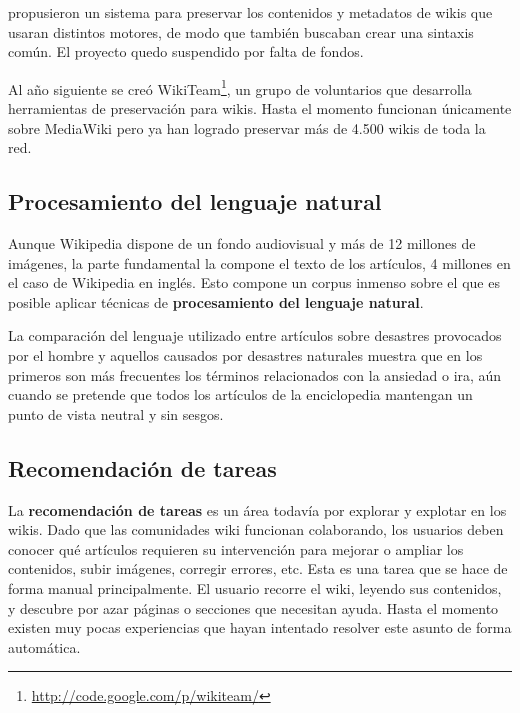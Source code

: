 \documentclass[11pt,onecolumn]{article}
\begin{document}
\citep{popitsch2010} propusieron un sistema para preservar los contenidos y metadatos de wikis que usaran distintos motores, de modo que también buscaban crear una sintaxis común. El proyecto quedo suspendido por falta de fondos.


Al año siguiente se creó WikiTeam\footnote{\href{http://code.google.com/p/wikiteam/}{http://code.google.com/p/wikiteam/}}, un grupo de voluntarios que desarrolla herramientas de preservación para wikis. Hasta el momento funcionan únicamente sobre MediaWiki pero ya han logrado preservar más de 4.500 wikis de toda la red.

\subsection{Procesamiento del lenguaje natural}

Aunque Wikipedia dispone de un fondo audiovisual y más de 12 millones de imágenes, la parte fundamental la compone el texto de los artículos, 4 millones en el caso de Wikipedia en inglés. Esto compone un corpus inmenso sobre el que es posible aplicar técnicas de \textbf{procesamiento del lenguaje natural}.

La comparación del lenguaje utilizado entre artículos sobre desastres provocados por el hombre y aquellos causados por desastres naturales muestra que en los primeros son más frecuentes los términos relacionados con la ansiedad o ira, aún cuando se pretende que todos los artículos de la enciclopedia mantengan un punto de vista neutral y sin sesgos.\citep{ferron2012}

\citep{sateli2012}


\subsection{Recomendación de tareas}

La \textbf{recomendación de tareas} es un área todavía por explorar y explotar en los wikis. Dado que las comunidades wiki funcionan colaborando, los usuarios deben conocer qué artículos requieren su intervención para mejorar o ampliar los contenidos, subir imágenes, corregir errores, etc. Esta es una tarea que se hace de forma manual principalmente. El usuario recorre el wiki, leyendo sus contenidos, y descubre por azar páginas o secciones que necesitan ayuda. Hasta el momento existen muy pocas experiencias que hayan intentado resolver este asunto de forma automática.
\end{document}
